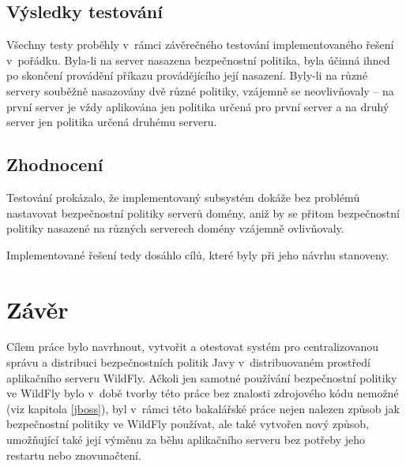 \section{Výsledky testování}

Všechny testy proběhly v~rámci závěrečného testování implementovaného řešení v~pořádku.
Byla-li na server nasazena bezpečnostní politika, byla účinná ihned po skončení provádění příkazu provádějícího její nasazení.
Byly-li na různé servery souběžně nasazovány dvě různé politiky, vzájemně se neovlivňovaly -- na první server je vždy aplikována jen politika určená pro první server a na druhý server jen politika určená druhému serveru.

\section{Zhodnocení}

Testování prokázalo, že implementovaný subsystém dokáže bez problémů nastavovat bezpečnostní politiky serverů domény, aniž by se přitom bezpečnostní politiky nasazené na různých serverech domény vzájemně ovlivňovaly.

Implementované řešení tedy dosáhlo cílů, které byly při jeho návrhu stanoveny.

\chapter{Závěr}

Cílem práce bylo navrhnout, vytvořit a otestovat systém pro centralizovanou správu a distribuci bezpečnostních politik Javy v~distribuovaném prostředí aplikačního serveru WildFly.
Ačkoli jen samotné používání bezpečnostní politiky ve WildFly bylo v~době tvorby této práce bez znalosti zdrojového kódu nemožné (viz kapitola \ref{jboss}),
byl v~rámci této bakalářské práce nejen nalezen způsob jak bezpečnostní politiky ve WildFly používat, ale také vytvořen nový způsob, umožňující také její výměnu za běhu aplikačního serveru bez potřeby jeho restartu nebo znovunačtení.

